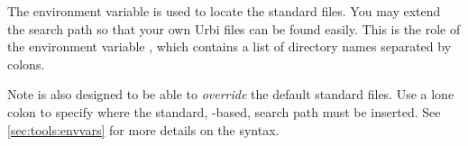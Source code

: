 The environment variable  is used to locate the \us
standard files.  You may extend the search path so that your own Urbi
files can be found easily.  This is the role of the environment
variable ,
which contains a list of directory names separated by colons.

Note  is also designed to be able to \emph{override}
the default standard files.  Use a lone colon to specify where the
standard, -based, search path must be inserted.  See
\autoref{sec:tools:envvars} for more details on the syntax.

